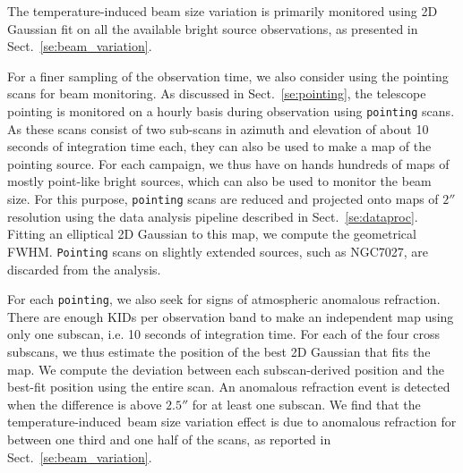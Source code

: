 \documentclass[traditionalabstract]{aa}
\newcommand{\afternoon}{temperature-induced}
\newcommand{\lp}[1]{#1}
\begin{document}
\begin{appendix}
The temperature-induced beam size variation is primarily monitored
using 2D Gaussian fit on all the available bright source observations,
as presented in Sect.~\ref{se:beam_variation}. 

For a finer sampling of the observation time, we also consider using
the pointing scans for beam monitoring. As discussed in
Sect.~\ref{se:pointing}, the telescope pointing is
monitored on a hourly basis during observation using {\tt pointing}
scans. As these scans consist of two sub-scans in azimuth and
elevation of about 10 seconds of integration time each, they
can also be used to make a map of the pointing source. For each campaign,
we thus have on hands hundreds of maps of mostly point-like bright
sources, which can also be used to monitor the beam size. 
For this purpose, {\tt pointing} scans are reduced 
and projected onto maps of $2''$ resolution using
the data analysis pipeline described in Sect.~\ref{se:dataproc}.
Fitting an elliptical 2D Gaussian to this map, we compute the geometrical FWHM.%
{\tt Pointing} scans on {\lp slightly extended} sources, such as NGC7027,
are discarded from the analysis.

For each {\tt pointing}, we also seek for signs of atmospheric
anomalous refraction. There are
enough KIDs per observation band to make an independent map using only
one subscan, i.e. 10 seconds of integration time.
For each of the four cross subscans, we thus estimate the position of the best
2D Gaussian that fits the map. We compute the deviation between each
subscan-derived position and the best-fit position using the entire
scan. An anomalous refraction event is detected when the difference is
above $2.5''$ for at least one subscan. We find that the \afternoon\
beam size variation effect is due to anomalous refraction for
between one third and one half of the scans, as reported in
Sect.~\ref{se:beam_variation}.


\end{appendix}
\end{document}
